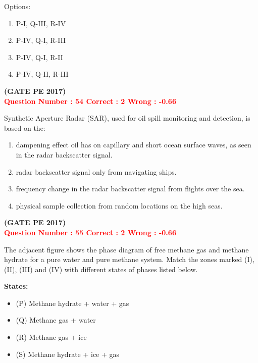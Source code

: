 \documentclass[journal,12pt,onecolumn]{article}
\begin{document}
{\vspace{1em}

Options:
\begin{enumerate}[label=(\Alph*)]
    \item P-I, Q-III, R-IV  
    \item P-IV, Q-I, R-III  
    \item P-IV, Q-I, R-II  
    \item P-IV, Q-II, R-III  
\end{enumerate}
\hfill\textbf{(GATE PE 2017)}\\[0.6cm]

\textcolor{red}{\textbf{Question Number : 54 \hfill Correct : 2  Wrong : -0.66}}


Synthetic Aperture Radar (SAR), used for oil spill monitoring and detection, is based on the:\\

\begin{enumerate}[label=(\Alph*)]
    \item dampening effect oil has on capillary and short ocean surface waves, as seen in the radar backscatter signal.
    \item radar backscatter signal only from navigating ships.
    \item frequency change in the radar backscatter signal from flights over the sea.
    \item physical sample collection from random locations on the high seas.
\end{enumerate}

\hfill\textbf{(GATE PE 2017)}\\[0.6cm]


\textcolor{red}{\textbf{Question Number : 55 \hfill Correct : 2  Wrong : -0.66}}


\begin{minipage}{0.58\textwidth}
The adjacent figure shows the phase diagram of free methane gas and methane hydrate for a pure water and pure methane system. Match the zones marked (I), (II), (III) and (IV) with different states of phases listed below.


\textbf{States:}
\begin{itemize}[leftmargin=*]
  \item (P) Methane hydrate + water + gas  
  \item (Q) Methane gas + water  
  \item (R) Methane gas + ice  
  \item (S) Methane hydrate + ice + gas  
\end{itemize}



\end{minipage}}
\end{document}
